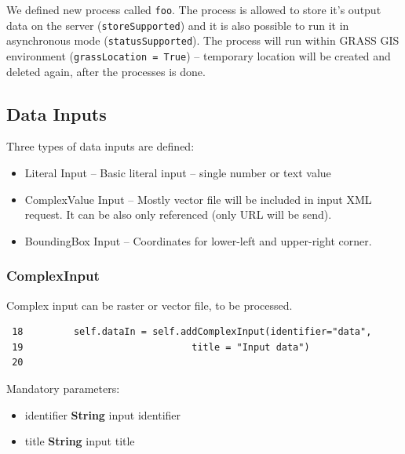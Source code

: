 \documentclass[a4paper,11pt]{report}
\begin{document}
We defined new process called \texttt{foo}. The process is allowed to
store it's output data on the server (\texttt{storeSupported}) and it is also possible to run it in
asynchronous mode (\texttt{statusSupported}). The process will run within
GRASS GIS environment (\texttt{grassLocation = True}) -- temporary location
will be created and deleted again, after the processes is done.
     
\subsection{Data Inputs}

Three types of data inputs are defined:
\begin{itemize}
    \item Literal Input -- Basic literal input -- single number or text
    value
    \item ComplexValue Input  -- Mostly vector file will be included in input XML
    request. It can be also only referenced (only URL will be send).
    \item BoundingBox Input -- Coordinates for lower-left and upper-right
    corner.
\end{itemize}


\subsubsection{ComplexInput}
Complex input can be raster or vector file, to be processed. 

\begin{verbatim}
 18         self.dataIn = self.addComplexInput(identifier="data",
 19                              title = "Input data")
 20 
\end{verbatim}

Mandatory parameters:
\begin{itemize}
    \item identifier \textbf{String} input identifier
    \item title \textbf{String} input title
\end{itemize}
\end{document}
